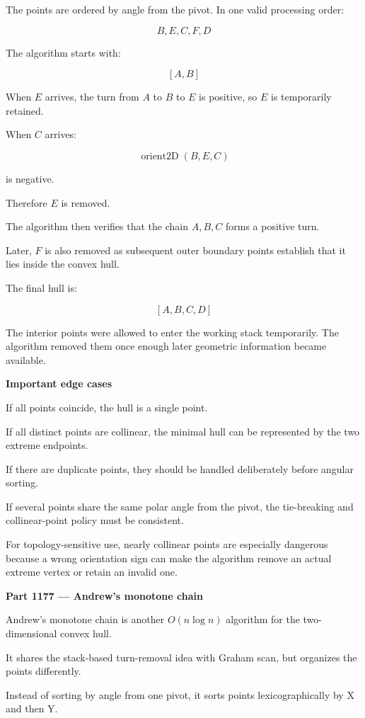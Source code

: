 The points are ordered by angle from the pivot. In one valid processing order:

\[
B,E,C,F,D
\]

The algorithm starts with:

\[
[A,B]
\]

When \(E\) arrives, the turn from \(A\) to \(B\) to \(E\) is positive, so \(E\) is temporarily retained.

When \(C\) arrives:

\[
\operatorname{orient2D}(B,E,C)
\]

is negative.

Therefore \(E\) is removed.

The algorithm then verifies that the chain \(A,B,C\) forms a positive turn.

Later, \(F\) is also removed as subsequent outer boundary points establish that it lies inside the convex hull.

The final hull is:

\[
\boxed{[A,B,C,D]}
\]

The interior points were allowed to enter the working stack temporarily. The algorithm removed them once enough later geometric information became available.

\textbf{Important edge cases}

If all points coincide, the hull is a single point.

If all distinct points are collinear, the minimal hull can be represented by the two extreme endpoints.

If there are duplicate points, they should be handled deliberately before angular sorting.

If several points share the same polar angle from the pivot, the tie-breaking and collinear-point policy must be consistent.

For topology-sensitive use, nearly collinear points are especially dangerous because a wrong orientation sign can make the algorithm remove an actual extreme vertex or retain an invalid one.

\textbf{Part 1177 --- Andrew's monotone chain}

Andrew's monotone chain is another \(O(n\log n)\) algorithm for the two-dimensional convex hull.

It shares the stack-based turn-removal idea with Graham scan, but organizes the points differently.

Instead of sorting by angle from one pivot, it sorts points lexicographically by X and then Y.

